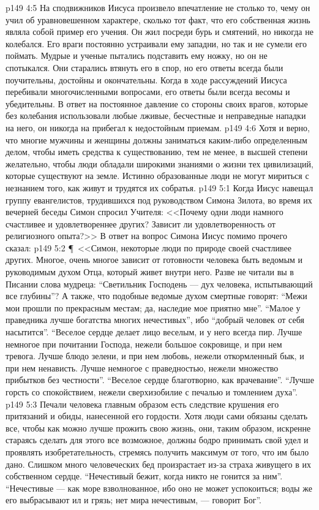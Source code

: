 \vs p149 4:5 На сподвижников Иисуса произвело впечатление не столько то, чему он учил об уравновешенном характере, сколько тот факт, что его собственная жизнь являла собой пример его учения. Он жил посреди бурь и смятений, но никогда не колебался. Его враги постоянно устраивали ему западни, но так и не сумели его поймать. Мудрые и ученые пытались подставить ему ножку, но он не спотыкался. Они старались втянуть его в спор, но его ответы всегда были поучительны, достойны и окончательны. Когда в ходе рассуждений Иисуса перебивали многочисленными вопросами, его ответы были всегда весомы и убедительны. В ответ на постоянное давление со стороны своих врагов, которые без колебания использовали любые лживые, бесчестные и неправедные нападки на него, он никогда на прибегал к недостойным приемам.
\vs p149 4:6 Хотя и верно, что многие мужчины и женщины должны заниматься каким\hyp{}либо определенным делом, чтобы иметь средства к существованию, тем не менее, в высшей степени желательно, чтобы люди обладали широкими знаниями о жизни тех цивилизаций, которые существуют на земле. Истинно образованные люди не могут мириться с незнанием того, как живут и трудятся их собратья.
\vs p149 5:1 Когда Иисус навещал группу евангелистов, трудившихся под руководством Симона Зилота, во время их вечерней беседы Симон спросил Учителя: <<Почему одни люди намного счастливее и удовлетвореннее других? Зависит ли удовлетворенность от религиозного опыта?>> В ответ на вопрос Симона Иисус помимо прочего сказал:
\vs p149 5:2 \P\ <<Симон, некоторые люди по природе своей счастливее других. Многое, очень многое зависит от готовности человека быть ведомым и руководимым духом Отца, который живет внутри него. Разве не читали вы в Писании слова мудреца: “Светильник Господень --- дух человека, испытывающий все глубины”? А также, что подобные ведомые духом смертные говорят: “Межи мои прошли по прекрасным местам; да, наследие мое приятно мне”. “Малое у праведника лучше богатства многих нечестивых”, ибо “добрый человек от себя насытится”. “Веселое сердце делает лицо веселым, и у него всегда пир. Лучше немногое при почитании Господа, нежели большое сокровище, и при нем тревога. Лучше блюдо зелени, и при нем любовь, нежели откормленный бык, и при нем ненависть. Лучше немногое с праведностью, нежели множество прибытков без честности”. “Веселое сердце благотворно, как врачевание”. “Лучше горсть со спокойствием, нежели сверхизобилие с печалью и томлением духа”.
\vs p149 5:3 Печали человека главным образом есть следствие крушения его притязаний и обиды, нанесенной его гордости. Хотя люди сами обязаны сделать все, чтобы как можно лучше прожить свою жизнь, они, таким образом, искренне стараясь сделать для этого все возможное, должны бодро принимать свой удел и проявлять изобретательность, стремясь получить максимум от того, что им было дано. Слишком много человеческих бед произрастает из\hyp{}за страха живущего в их собственном сердце. “Нечестивый бежит, когда никто не гонится за ним”. “Нечестивые --- как море взволнованное, ибо оно не может успокоиться; воды же его выбрасывают ил и грязь; нет мира нечестивым, --- говорит Бог”.
